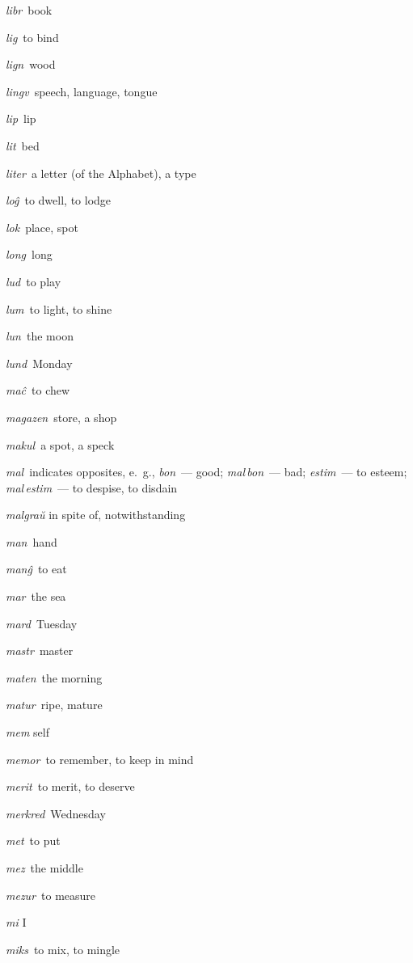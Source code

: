 \begin{landscape}
\begin{multicols}{5}
\begin{outdent}{1em}
\emph{libr\,} book

\emph{lig\,} to bind

\emph{lign\,} wood

\emph{lingv\,} speech, language, tongue

\emph{lip\,} lip

\emph{lit\,} bed

\emph{liter\,} a letter (of the Alphabet), a type

\emph{loĝ\,} to dwell, to lodge

\emph{lok\,} place, spot

\emph{long\,} long

\emph{lud\,} to play

\emph{lum\,} to light, to shine

\emph{lun\,} the moon

\emph{lund\,} Monday
\end{outdent}


\begin{outdent}{1em}
\emph{maĉ\,} to chew

\emph{magazen\,} store, a shop

\emph{makul\,} a spot, a speck

\emph{mal\,} indicates opposites, e.~g., \emph{bon\,} — good; \emph{mal\,bon\,} — bad; \emph{estim\,} — to esteem; \emph{mal\,estim\,} — to despise, to disdain

\emph{malgraŭ} in spite of, notwithstanding

\emph{man\,} hand

\emph{manĝ\,} to eat

\emph{mar\,} the sea

\emph{mard\,} Tuesday

\emph{mastr\,} master

\emph{maten\,} the morning

\emph{matur\,} ripe, mature

\emph{mem} self

\emph{memor\,} to remember, to keep in mind

\emph{merit\,} to merit, to deserve

\emph{merkred\,} Wednesday

\emph{met\,} to put

\emph{mez\,} the middle

\emph{mezur\,} to measure

\emph{mi} I

\emph{miks\,} to mix, to mingle


\end{outdent}
\end{multicols}
\end{landscape}
